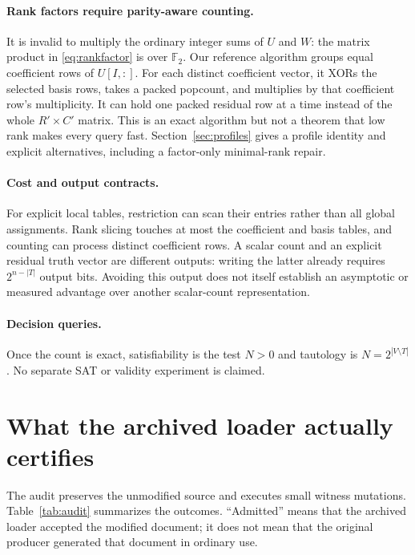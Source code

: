 \documentclass[11pt]{article}
\newcommand{\F}{\mathbb F_2}
\theoremstyle{definition}\newtheorem{definition}[theorem]{Definition}
\theoremstyle{remark}\newtheorem{remark}[theorem]{Remark}
\begin{document}
\paragraph{Rank factors require parity-aware counting.}
It is invalid to multiply the ordinary integer sums of $U$ and $W$: the matrix product in \eqref{eq:rankfactor} is over $\F$. Our reference algorithm groups equal coefficient rows of $U[I,:]$. For each distinct coefficient vector, it XORs the selected basis rows, takes a packed popcount, and multiplies by that coefficient row's multiplicity. It can hold one packed residual row at a time instead of the whole $R'\times C'$ matrix. This is an exact algorithm but not a theorem that low rank makes every query fast. Section~\ref{sec:profiles} gives a profile identity and explicit alternatives, including a factor-only minimal-rank repair.

\paragraph{Cost and output contracts.}
For explicit local tables, restriction can scan their entries rather than all global assignments. Rank slicing touches at most the coefficient and basis tables, and counting can process distinct coefficient rows. A scalar count and an explicit residual truth vector are different outputs: writing the latter already requires $2^{n-|T|}$ output bits. Avoiding this output does not itself establish an asymptotic or measured advantage over another scalar-count representation.

\paragraph{Decision queries.}
Once the count is exact, satisfiability is the test $N>0$ and tautology is $N=2^{|V\setminus T|}$. No separate SAT or validity experiment is claimed.



\section{What the archived loader actually certifies}
\label{sec:audit}
The audit preserves the unmodified source and executes small witness mutations. Table~\ref{tab:audit} summarizes the outcomes. ``Admitted'' means that the archived loader accepted the modified document; it does not mean that the original producer generated that document in ordinary use.
\end{document}
